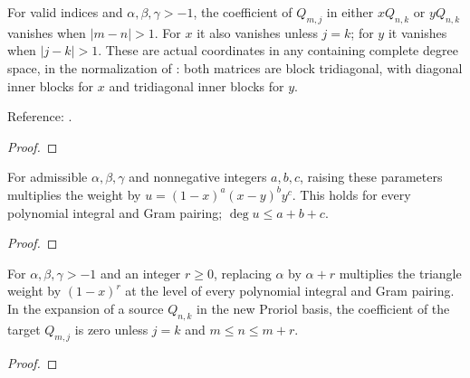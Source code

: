 \begin{theorem}
\label{thm:proriol-triangle-multiplication}
\leanok
For valid indices and $\alpha,\beta,\gamma>-1$, the coefficient of $Q_{m,j}$
in either $xQ_{n,k}$ or $yQ_{n,k}$ vanishes when $|m-n|>1$.
For $x$ it also vanishes unless $j=k$; for $y$ it vanishes when $|j-k|>1$.
These are actual coordinates in any containing complete degree space, in the
normalization of \cite{dlmf}: both matrices are block tridiagonal, with diagonal inner
blocks for $x$ and tridiagonal inner blocks for $y$.

Reference: \cite[Section 2.2]{gutleb-olver}.
\end{theorem}
\begin{proof}
\leanok
\end{proof}

\begin{supporting}
\begin{theorem}
\label{thm:proriol-all-shift-measures}
\leanok
For admissible $\alpha,\beta,\gamma$ and nonnegative integers $a,b,c$, raising
these parameters multiplies the weight by $u=(1-x)^a(x-y)^b y^c$.
This holds for every polynomial integral and Gram pairing; $\deg u\le a+b+c$.
\end{theorem}
\begin{proof}
\leanok
\end{proof}
\end{supporting}


\begin{theorem}
\label{thm:proriol-alpha-conversion}
\leanok
For $\alpha,\beta,\gamma>-1$ and an integer $r\ge0$, replacing $\alpha$ by
$\alpha+r$ multiplies the triangle weight by $(1-x)^r$ at the level of every
polynomial integral and Gram pairing. In the expansion of a source $Q_{n,k}$
in the new Proriol basis, the coefficient of the target $Q_{m,j}$ is zero unless
$j=k$ and $m\le n\le m+r$.
\end{theorem}
\begin{proof}
\leanok
\end{proof}

